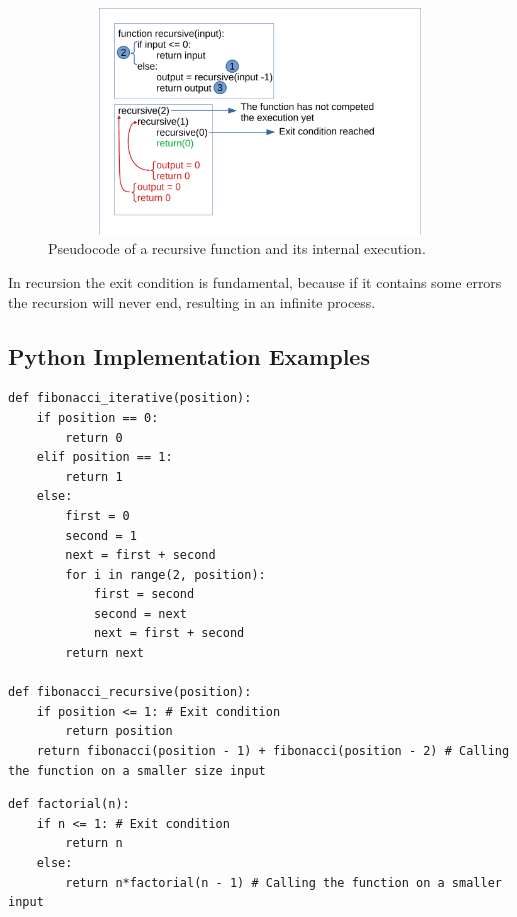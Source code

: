 \begin{figure}[hb]
	\includegraphics[width=14cm,height=6cm]{chapters/introduction/images/recursion_1.pdf}
	\caption[]{Pseudocode of a recursive function and its internal execution.}
	\label{recursion_1}
\end{figure}

In recursion the exit condition is fundamental, because if it contains some errors the recursion will never end, resulting in an infinite process.

\newpage
\subsection{Python Implementation Examples}

\begin{lstlisting}[caption={Implementation of the Fibonacci series with both iterative and recursive way.}]
def fibonacci_iterative(position):
	if position == 0:
		return 0
	elif position == 1:
		return 1
	else:
		first = 0
		second = 1
		next = first + second
		for i in range(2, position):
			first = second
			second = next
			next = first + second
		return next

def fibonacci_recursive(position):
	if position <= 1: # Exit condition
		return position
	return fibonacci(position - 1) + fibonacci(position - 2) # Calling the function on a smaller size input
\end{lstlisting}

\begin{lstlisting}[caption={Implementation of calculating the factorial of a number using the recursive way.}]
def factorial(n):
	if n <= 1: # Exit condition
		return n
	else: 
		return n*factorial(n - 1) # Calling the function on a smaller input
\end{lstlisting}